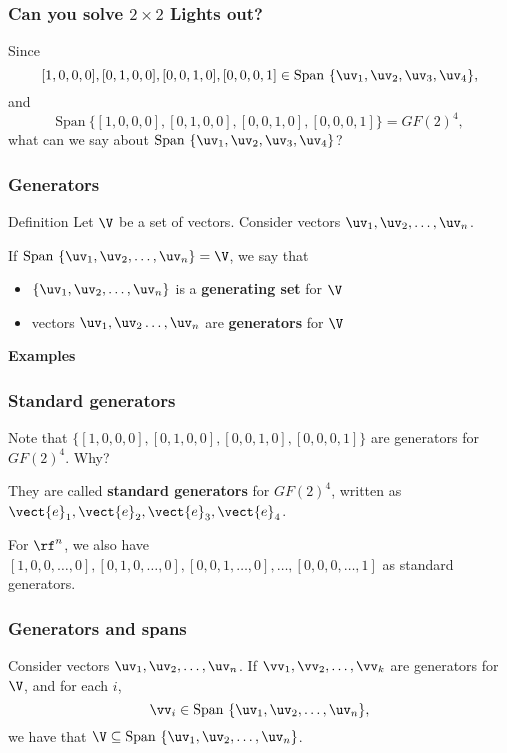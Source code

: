 \begin{frame}
  \frametitle{Can you solve $2\times 2$ Lights out?}

  Since
  \[
  [1,0,0,0], [0,1,0,0], [0,0,1,0], [0,0,0,1]\in {\mathrm{Span}}\ \{\uv_1,\uv_2,\uv_3,\uv_4\},
  \]
  and
  \pause
  \[
  \mathrm{Span}\ \{[1,0,0,0], [0,1,0,0], [0,0,1,0], [0,0,0,1]\} = GF(2)^4,
  \]
  \pause
  what can we say about ${\mathrm{Span}}\ \{\uv_1,\uv_2,\uv_3,\uv_4\}$?

\end{frame}


\begin{frame}
  \frametitle{Generators}

  \begin{block}{Definition}
    Let $\V$ be a set of vectors.  Consider vectors $\uv_1,\uv_2,\ldots,\uv_n$.

    If $\mathrm{Span}\ \{\uv_1,\uv_2,\ldots,\uv_n\} = \V$, we say that
    \begin{itemize}
    \item $\{\uv_1,\uv_2,\ldots,\uv_n\}$ is a {\bf generating set} for $\V$
    \item vectors $\uv_1,\uv_2\ldots,\uv_n$ are {\bf generators} for $\V$
    \end{itemize}
  \end{block}

  \pause

  {\bf Examples}
  \vspace{1.5in}
\end{frame}

\begin{frame}
  \frametitle{Standard generators}

  Note that $\{[1,0,0,0], [0,1,0,0], [0,0,1,0], [0,0,0,1]\}$ are
  generators for $GF(2)^4$.  Why?

  \vspace{0.5in}
  \pause

  They are called {\bf standard generators} for $GF(2)^4$, written as $\vect{e}_1,\vect{e}_2,\vect{e}_3,\vect{e}_4$.
  \pause

  \vspace{0.2in}

  For $\rf^n$, we also have
  $[1,0,0,\ldots,0],[0,1,0,\ldots,0],[0,0,1,\ldots,0],\ldots,[0,0,0,\ldots,1]$
  as standard generators.
  
\end{frame}

\begin{frame}
  \frametitle{Generators and spans}
  \begin{lemma}
    Consider vectors $\uv_1,\uv_2,\ldots,\uv_n$.
    If $\vv_1,\vv_2,\ldots,\vv_k$ are generators for $\V$, and for each $i$,
    \[
    \vv_i\in \mathrm{Span}\ \{\uv_1,\uv_2,\ldots,\uv_n\},
    \]
    we have that $\V \subseteq \mathrm{Span}\ \{\uv_1,\uv_2,\ldots,\uv_n\}$.
  \end{lemma}

  \vspace{2in}
\end{frame}

